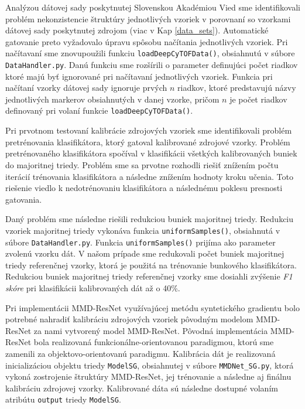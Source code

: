 Analýzou dátovej sady poskytnutej Slovenskou Akadémiou Vied sme identifikovali problém nekonzistencie štruktúry jednotlivých vzoriek v porovnaní so vzorkami dátovej sady poskytnutej zdrojom \cite{Li2017} (viac v Kap \ref{data_sets}). Automatické gatovanie preto vyžadovalo úpravu spôsobu načítania jednotlivých vzoriek. Pri načítavaní sme znovupoužili funkciu \texttt{loadDeepCyTOFData()}, obsiahnutú v súbore \texttt{DataHandler.py}. Danú funkciu sme rozšírili o parameter definujúci počet riadkov ktoré majú byť ignorované pri načítavaní jednotlivých vzoriek. Funkcia pri načítaní vzorky dátovej sady ignoruje prvých $n$ riadkov, ktoré predstavujú názvy jednotlivých markerov obsiahnutých v danej vzorke, pričom $n$ je počet riadkov definovaný pri volaní funkcie \texttt{loadDeepCyTOFData()}.

Pri prvotnom testovaní kalibrácie zdrojových vzoriek sme identifikovali problém pretrénovania klasifikátora, ktorý gatoval kalibrované zdrojové vzorky. Problém pretrénovaného klasifikátora spočíval v klasifikácii všetkých kalibrovaných buniek do majoritnej triedy. Problém sme sa prvotne rozhodli riešiť znížením počtu iterácií trénovania klasifikátora a následne znížením hodnoty kroku učenia. Toto riešenie viedlo k nedotrénovaniu klasifikátora a následnému poklesu presnosti gatovania.

Daný problém sme následne riešili redukciou buniek majoritnej triedy. Redukciu vzoriek majoritnej triedy vykonáva funkcia \texttt{uniformSamples()}, obsiahnutá v súbore \texttt{DataHandler.py}. Funkcia \texttt{uniformSamples()} prijíma ako parameter zvolenú vzorku dát. V našom prípade sme redukovali počet buniek majoritnej triedy referenčnej vzorky, ktorá je použitá na trénovanie bunkového klasifikátora. Redukciou buniek majoritnej triedy referenčnej vzorky sme dosiahli zvýšenie \textit{F1 skóre} pri klasifikácii kalibrovaných dát až o 40\%.

\begin{sloppypar}
Pri implementácii MMD-ResNet využívajúcej metódu syntetického gradientu bolo potrebné nahradiť kalibráciu zdrojových vzoriek pôvodným modelom MMD-ResNet za nami vytvorený model MMD-ResNet. Pôvodná implementácia MMD-ResNet bola realizovaná funkcionálne-orientovanou paradigmou, ktorú sme zamenili za objektovo-orientovanú paradigmu. Kalibrácia dát je realizovaná inicializáciou objektu triedy \texttt{ModelSG}, obsiahnutej v súbore \texttt{MMDNet_SG.py}, ktorá vykoná zostrojenie štruktúry MMD-ResNet, jej trénovanie a následne aj finálnu kalibráciu zdrojovej vzorky. Kalibrované dáta sú následne dostupné volaním atribútu \texttt{output} triedy \texttt{ModelSG}.
\end{sloppypar}

